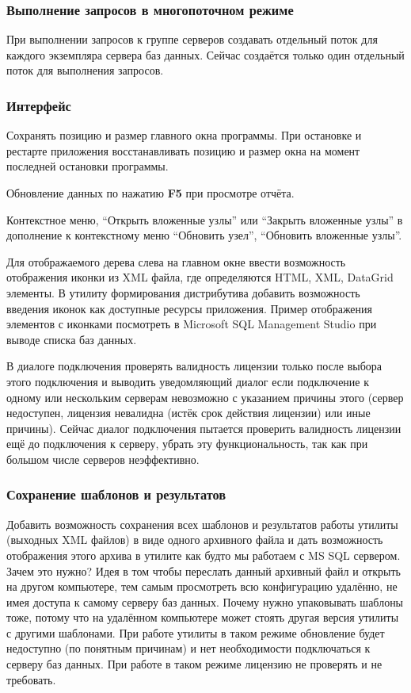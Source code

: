 \subsubsection{Выполнение запросов в многопоточном режиме}

При выполнении запросов к группе серверов создавать отдельный поток для каждого экземпляра сервера
баз данных. Сейчас создаётся только один отдельный поток для выполнения запросов.

\subsubsection{Интерфейс}

Сохранять позицию и размер главного окна программы. При остановке и рестарте приложения
восстанавливать позицию и размер окна на момент последней остановки программы.

\bigskip

Обновление данных по нажатию \textbf{F5} при просмотре отчёта.

\bigskip

Контекстное меню, ``Открыть вложенные узлы'' или ``Закрыть вложенные узлы'' в дополнение к
контекстному меню ``Обновить узел'', ``Обновить вложенные узлы''.

\bigskip

Для отображаемого дерева слева на главном окне ввести возможность отображения иконки из XML файла,
где определяются HTML, XML, DataGrid элементы. В утилиту формирования дистрибутива добавить
возможность введения иконок как доступные ресурсы приложения. Пример отображения элементов с
иконками посмотреть в Micro\-soft SQL Mana\-gement Studio при выводе списка баз данных.

\bigskip

В диалоге подключения проверять валидность лицензии только после выбора этого подключения и выводить
уведомляющий диалог если подключение к одному или нескольким серверам невозможно с указанием причины
этого (сервер недоступен, лицензия невалидна (истёк срок действия лицензии) или иные причины).
Сейчас диалог подключения пытается проверить валидность лицензии ещё до подключения к серверу,
убрать эту функциональность, так как при большом числе серверов неэффективно.

\subsubsection{Сохранение шаблонов и результатов}

Добавить возможность сохранения всех шаблонов и результатов работы утилиты (выходных XML файлов) в
виде одного архивного файла и дать возможность отображения этого архива в утилите как будто мы
работаем с MS SQL сервером. Зачем это нужно? Идея в том чтобы переслать данный архивный файл и
открыть на другом компьютере, тем самым просмотреть всю конфигурацию удалённо, не имея доступа к
самому серверу баз данных. Почему нужно упаковывать шаблоны тоже, потому что на удалённом компьютере
может стоять другая версия утилиты с другими шаблонами. При работе утилиты в таком режиме обновление
будет недоступно (по понятным причинам) и нет необходимости подключаться к серверу баз данных. При
работе в таком режиме лицензию не проверять и не требовать.

